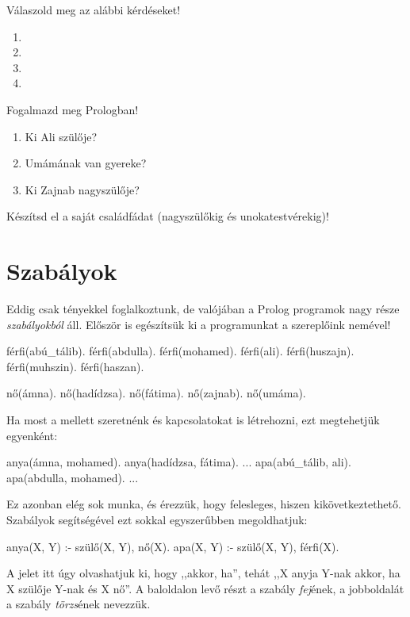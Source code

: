 \begin{problem}
Válaszold meg az alábbi kérdéseket!
\begin{enumerate}
\item {}
\item {}
\item {}
\item {}
\end{enumerate}
\end{problem}
\begin{problem}
Fogalmazd meg Prologban!
\begin{enumerate}
\item Ki Ali szülője?
\item Umámának van gyereke?
\item Ki Zajnab nagyszülője?
\end{enumerate}
\end{problem}
\begin{problem}
Készítsd el a saját családfádat (nagyszülőkig
és unokatestvérekig)!
\end{problem}

\section{Szabályok}

Eddig csak tényekkel foglalkoztunk, de valójában a
Prolog programok nagy része \emph{szabályokból}
áll. Először is egészítsük ki a programunkat a
szereplőink nemével!

\begin{program}
férfi(abú_tálib).
férfi(abdulla).
férfi(mohamed).
férfi(ali).
férfi(huszajn).
férfi(muhszin).
férfi(haszan).

nő(ámna).
nő(hadídzsa).
nő(fátima).
nő(zajnab).
nő(umáma).
\end{program}

Ha most a  mellett szeretnénk  és
 kapcsolatokat is létrehozni, ezt
megtehetjük egyenként:
\begin{program}
anya(ámna, mohamed).
anya(hadídzsa, fátima).
...
apa(abú_tálib, ali).
apa(abdulla, mohamed).
...
\end{program}
Ez azonban elég sok munka, és érezzük, hogy
felesleges, hiszen kikövetkeztethető.  Szabályok
segítségével ezt sokkal egyszerűbben megoldhatjuk:
\begin{program}
anya(X, Y) :- szülő(X, Y), nő(X).
apa(X, Y) :- szülő(X, Y), férfi(X).
\end{program}
A \pr{:-} jelet itt úgy olvashatjuk ki, hogy
,,akkor, ha'', tehát ,,X anyja Y-nak akkor, ha X
szülője Y-nak és X nő''. A baloldalon levő részt a
szabály \emph{fej}\/ének, a jobboldalát a szabály
\emph{törzs}\/ének nevezzük.
\index{\pr{:-}}

